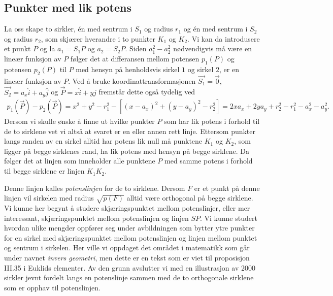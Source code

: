 \documentclass[norsk,twoside,utf8]{article}
\newcommand{\EQU}[1] { \begin{equation*} \begin{split} #1 \end{split} \end{equation*} }
\begin{document}
\subsection{Punkter med lik potens}
La oss skape to sirkler, én med sentrum i $S_1$ og radius $r_1$ og én med sentrum i $S_2$ og radius $r_2$, som skjærer hverandre i to punkter $K_1$ og $K_2$. Vi kan da introdusere et punkt $P$ og la $a_1=S_1 P$ og $a_2 = S_2 P$. Siden $a_1^2-a_2^2$ nødvendigvis må være en lineær funksjon av $P$ følger det at differansen mellom potensen $p_1(P)$ og potensen $p_2(P)$ til $P$ med hensyn på henholdsvis sirkel $1$ og sirkel $2$, er en lineær funksjon av $P$. Ved å bruke koordinattransformasjonen $\vec{S_1}=\vec{0}$, $\vec{S_2}=a_x\hat{i}+a_y\hat{j}$ og $\vec{P}=x\hat{i}+y\hat{j}$ fremstår dette også tydelig ved
\EQU{
p_1(\vec{P})-p_2(\vec{P})=x^2+y^2-r_1^2-\left[ (x-a_x)^2+(y-a_y)^2-r_2^2 \right] = 2xa_x+2ya_y+r_2^2-r_1^2-a_x^2-a_y^2.
}
Dersom vi skulle ønske å finne ut hvilke punkter $P$ som har lik potens i forhold til de to sirklene vet vi altså at svaret er en eller annen rett linje. Ettersom punkter langs randen av en sirkel alltid har potens lik null må punktene $K_1$ og $K_2$, som ligger på begge sirklenes rand, ha lik potens med hensyn på begge sirklene. Da følger det at linjen som inneholder alle punktene $P$ med samme potens i forhold til begge sirklene er linjen $K_1K_2$.

\begin{center}
\end{center}

\noindent
Denne linjen kalles \textit{potenslinjen} for de to sirklene. Dersom $F$ er et punkt på denne linjen vil sirkelen med radius $\sqrt{p(F)}$ alltid være orthogonal på begge sirklene. Vi kunne her begynt å studere skjæringspunktet mellom potenslinjer, eller mer interessant, skjæringspunktet mellom potenslinjen og linjen $SP$. Vi kunne studert hvordan ulike mengder oppfører seg under avbildningen som bytter ytre punkter for en sirkel med skjæringspunktet mellom potenslinjen og linjen mellom punktet og sentrum i sirkelen. Her ville vi oppdaget det området i matematikk som går under navnet \textit{invers geometri}, men dette er en tekst som er viet til proposisjon III.35 i Euklids elementer. Av den grunn avslutter vi med en illustrasjon av 2000 sirkler jevnt fordelt langs en potenslinje sammen med de to orthogonale sirklene som er opphav til potenslinjen.
\end{document}
